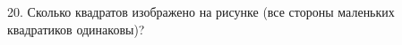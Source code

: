 20. Сколько квадратов изображено на рисунке (все стороны маленьких квадратиков одинаковы)?
\begin{center}
\begin{figure}[ht!]
\end{figure}
\end{center}
